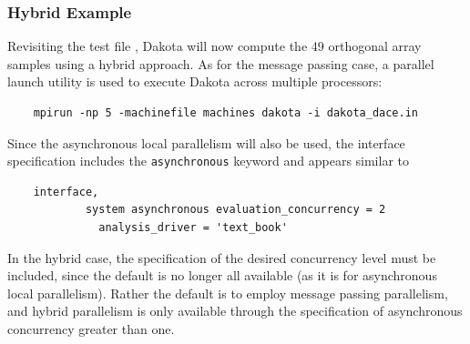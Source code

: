 \subsubsection{Hybrid Example}\label{parallel:SLP:hybrid:ex}

Revisiting the test file , Dakota will now
compute the 49 orthogonal array samples using a hybrid approach.  As
for the message passing case, a parallel launch utility is used to
execute Dakota across multiple processors:
\begin{small}
\begin{verbatim}
    mpirun -np 5 -machinefile machines dakota -i dakota_dace.in
\end{verbatim}
\end{small}

Since the asynchronous local parallelism will also be used, the
interface specification includes the \texttt{asynchronous}
keyword and appears similar to
\begin{small}
\begin{verbatim}
    interface,
            system asynchronous evaluation_concurrency = 2
              analysis_driver = 'text_book'
\end{verbatim}
\end{small}
In the hybrid case, the specification of the desired concurrency level
must be included, since the default is no longer all available (as it
is for asynchronous local parallelism).  Rather the default is to employ
message passing parallelism, and hybrid parallelism is only available
through the specification of asynchronous concurrency greater than one.


